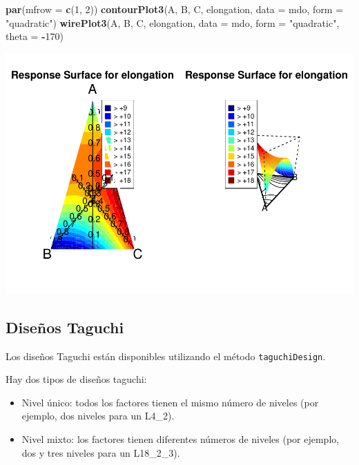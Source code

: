 \documentclass[
]{book}
\newenvironment{Shaded}{\begin{snugshade}}{\end{snugshade}}
\newcommand{\AttributeTok}[1]{\textcolor[rgb]{0.13,0.29,0.53}{#1}}
\newcommand{\DecValTok}[1]{\textcolor[rgb]{0.00,0.00,0.81}{#1}}
\newcommand{\FunctionTok}[1]{\textcolor[rgb]{0.13,0.29,0.53}{\textbf{#1}}}
\newcommand{\NormalTok}[1]{#1}
\newcommand{\SpecialCharTok}[1]{\textcolor[rgb]{0.81,0.36,0.00}{\textbf{#1}}}
\newcommand{\StringTok}[1]{\textcolor[rgb]{0.31,0.60,0.02}{#1}}
\providecommand{\tightlist}{%
  \setlength{\itemsep}{0pt}\setlength{\parskip}{0pt}}
\begin{document}
\begin{Shaded}
\begin{Highlighting}[]
\FunctionTok{par}\NormalTok{(}\AttributeTok{mfrow =} \FunctionTok{c}\NormalTok{(}\DecValTok{1}\NormalTok{, }\DecValTok{2}\NormalTok{))}
\FunctionTok{contourPlot3}\NormalTok{(A, B, C, elongation, }\AttributeTok{data =}\NormalTok{ mdo, }\AttributeTok{form =} \StringTok{"quadratic"}\NormalTok{)}
\FunctionTok{wirePlot3}\NormalTok{(A, B, C, elongation, }\AttributeTok{data =}\NormalTok{ mdo, }\AttributeTok{form =} \StringTok{"quadratic"}\NormalTok{, }\AttributeTok{theta =} \SpecialCharTok{{-}}\DecValTok{170}\NormalTok{)}
\end{Highlighting}
\end{Shaded}

\includegraphics{Libro_TidyQualityTools_files/figure-latex/unnamed-chunk-130-1.pdf}

\hypertarget{diseuxf1os-taguchi}{%
\subsection{Diseños Taguchi}\label{diseuxf1os-taguchi}}

Los diseños Taguchi están disponibles utilizando el método \texttt{taguchiDesign}.

Hay dos tipos de diseños taguchi:

\begin{itemize}
\tightlist
\item
  Nivel único: todos los factores tienen el mismo número de niveles (por ejemplo, dos niveles para un L4\_2).
\item
  Nivel mixto: los factores tienen diferentes números de niveles (por ejemplo, dos y tres niveles para un L18\_2\_3).
\end{itemize}
\end{document}
